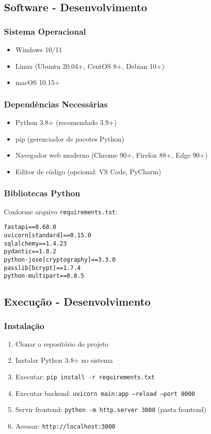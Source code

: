 \documentclass[12pt,a4paper]{article}
\begin{document}
\subsection{Software - Desenvolvimento}
\subsubsection{Sistema Operacional}
\begin{itemize}
    \item Windows 10/11
    \item Linux (Ubuntu 20.04+, CentOS 8+, Debian 10+)
    \item macOS 10.15+
\end{itemize}

\subsubsection{Dependências Necessárias}
\begin{itemize}
    \item Python 3.8+ (recomendado 3.9+)
    \item pip (gerenciador de pacotes Python)
    \item Navegador web moderno (Chrome 90+, Firefox 88+, Edge 90+)
    \item Editor de código (opcional: VS Code, PyCharm)
\end{itemize}

\subsubsection{Bibliotecas Python}
Conforme arquivo \texttt{requirements.txt}:
\begin{lstlisting}
fastapi==0.68.0
uvicorn[standard]==0.15.0
sqlalchemy==1.4.23
pydantic==1.8.2
python-jose[cryptography]==3.3.0
passlib[bcrypt]==1.7.4
python-multipart==0.0.5
\end{lstlisting}

\subsection{Execução - Desenvolvimento}
\subsubsection{Instalação}
\begin{enumerate}
    \item Clonar o repositório do projeto
    \item Instalar Python 3.8+ no sistema
    \item Executar: \texttt{pip install -r requirements.txt}
    \item Executar backend: \texttt{uvicorn main:app --reload --port 8000}
    \item Servir frontend: \texttt{python -m http.server 3000} (pasta frontend)
    \item Acessar: \texttt{http://localhost:3000}
\end{enumerate}
\end{document}
